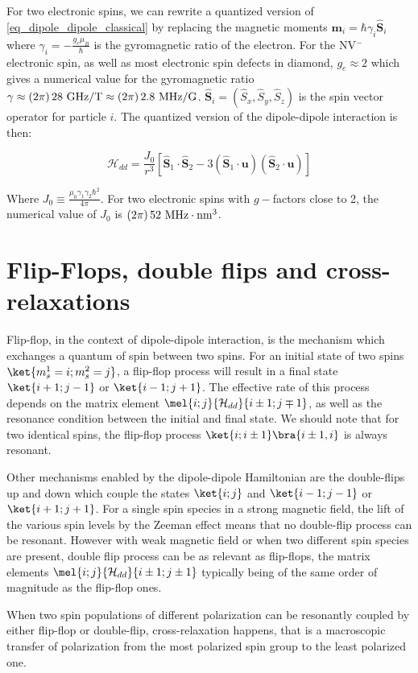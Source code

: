 \documentclass[a4paper]{book}
\begin{document}
For two electronic spins, we can rewrite a quantized version of \ref{eq_dipole_dipole_classical} by replacing the magnetic moments $\mathbf{m}_i=\hbar \gamma_i \hat{\mathbf{S}}_i$ where $\gamma_i=-\frac{g_e \mu_B}{\hbar}$ is the gyromagnetic ratio of the electron. For the NV$^-$ electronic spin, as well as most electronic spin defects in diamond, $g_e\approx 2$ which gives a numerical value for the gyromagnetic ratio $\gamma \approx (2\pi)\,28\ \rm{GHz/T} \approx (2\pi)\,2.8\ \rm MHz/G$. $\hat{\mathbf{S}}_i=(\hat S_x, \hat S_y, \hat S_z)$ is the spin vector operator for particle $i$. The quantized version of the dipole-dipole interaction is then:

\begin{equation}
\mathcal{H}_{dd}=\frac{J_0}{r^3}\left[ \hat{\mathbf{S}}_1\cdot\hat{\mathbf{S}}_2 - 3 (\hat{\mathbf{S}}_1\cdot\mathbf{u})(\hat{\mathbf{S}}_2\cdot\mathbf{u})\right]
\end{equation}

Where $J_0\equiv \frac{\mu_0\gamma_1\gamma_2 \hbar^2}{4\pi}$. For two electronic spins with $g-$factors close to 2, the numerical value of $J_0$ is $(2\pi)\,52\ \rm{MHz}\cdot\rm{nm}^3$.

\section{Flip-Flops, double flips and cross-relaxations}

Flip-flop, in the context of dipole-dipole interaction, is the mechanism which exchanges a quantum of spin between two spins. For an initial state of two spins $\ket{m_s^1=i;m_s^2=j}$, a flip-flop process will result in a final state $\ket{i+1;j-1}$ or $\ket{i-1;j+1}$. The effective rate of this process depends on the matrix element $\mel{i;j}{\mathcal{H}_{dd}}{i\pm 1;j \mp 1}$, as well as the resonance condition between the initial and final state. We should note that for two identical spins, the flip-flop process $\ket{i;i\pm 1}\bra{i\pm 1,i}$ is always resonant.

Other mechanisms enabled by the dipole-dipole Hamiltonian are the double-flips up and down which couple the states $\ket{i;j}$ and $\ket{i-1;j-1}$ or $\ket{i+1;j+1}$. For a single spin species in a strong magnetic field, the lift of the various spin levels by the Zeeman effect means that no double-flip process can be resonant. However with weak magnetic field or when two different spin species are present, double flip process can be as relevant as flip-flops, the matrix elements $\mel{i;j}{\mathcal{H}_{dd}}{i\pm 1;j \pm 1}$ typically being of the same order of magnitude as the flip-flop ones.

When two spin populations of different polarization can be resonantly coupled by either flip-flop or double-flip, cross-relaxation happens, that is a macroscopic transfer of polarization from the most polarized spin group to the least polarized one.

\printbibliography
\end{document}
